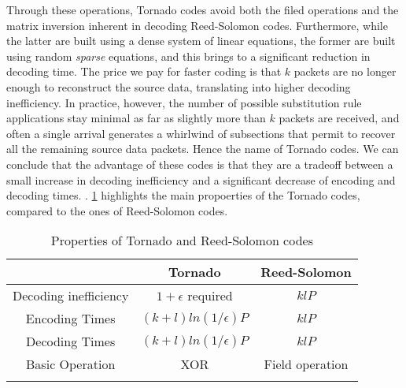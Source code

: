 Through these operations, Tornado codes avoid both the filed operations and the matrix inversion inherent in decoding Reed-Solomon codes. Furthermore, while the latter are built using a dense system of linear equations, the former are built using random \textit{sparse} equations, and this brings to a significant reduction in decoding time. The price we pay for faster coding is that $k$ packets are no longer enough to reconstruct the source data, translating into higher decoding inefficiency. In practice, however, the number of possible substitution rule applications stay minimal as far as slightly more than $k$ packets are received, and often a single arrival generates a whirlwind of subsections that permit to recover all the remaining source data packets. Hence the name of Tornado codes. We can conclude that the advantage of these codes is that they are a tradeoff between a small increase in decoding inefficiency and a significant decrease of encoding and decoding times. \cite{Byers}. \ref{tab:Tornado} highlights the main propoerties of the Tornado codes, compared to the ones of Reed-Solomon codes.
\begin{table}
\centering
\caption{Properties of Tornado and Reed-Solomon codes}
\label{tab:Tornado}
\begin{tabular}{c|cc}
  \firsthline
  & Tornado & Reed-Solomon\\
  \hline
  Decoding inefficiency & $1+\epsilon$ required & $klP$\\
  Encoding Times & $(k+l)ln(1/\epsilon)P$ & $klP$\\
  Decoding Times & $(k+l)ln(1/\epsilon)P$ & $klP$\\
  Basic Operation & XOR & Field operation \\
  \lasthline
\end{tabular}
\end{table}
